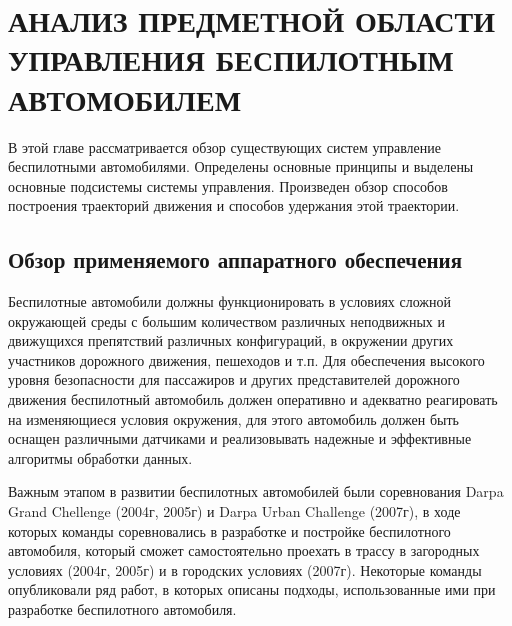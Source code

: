 \chapter{АНАЛИЗ ПРЕДМЕТНОЙ ОБЛАСТИ УПРАВЛЕНИЯ БЕСПИЛОТНЫМ АВТОМОБИЛЕМ}
В этой главе рассматривается обзор существующих систем управление беспилотными автомобилями.
Определены основные принципы и выделены основные подсистемы системы управления. Произведен
обзор способов построения траекторий движения и способов удержания этой траектории.

\section{Обзор применяемого аппаратного обеспечения}

Беспилотные автомобили должны функционировать в условиях сложной окружающей среды с большим
количеством различных неподвижных и движущихся препятствий различных конфигураций, в окружении
других участников дорожного движения, пешеходов и т.п. Для обеспечения высокого уровня
безопасности для пассажиров и других представителей дорожного движения беспилотный автомобиль
должен оперативно и адекватно реагировать на изменяющиеся условия окружения, для этого автомобиль
должен быть оснащен различными датчиками и реализовывать надежные и эффективные алгоритмы обработки данных.

Важным этапом в развитии беспилотных автомобилей были соревнования Darpa Grand Chellenge (2004г, 2005г)
и Darpa Urban Challenge (2007г), в ходе которых команды соревновались в разработке и постройке
беспилотного автомобиля, который сможет самостоятельно проехать в трассу в загородных условиях
(2004г, 2005г) и в городских условиях (2007г). Некоторые команды опубликовали ряд работ, в
которых описаны подходы, использованные ими при разработке беспилотного автомобиля.

